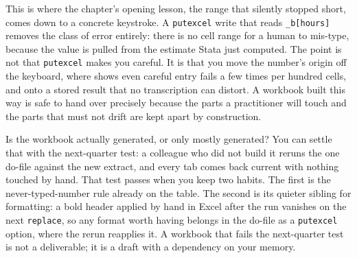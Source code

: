 \documentclass[
    a4paper,
    fontsize=10pt,
    twoside=true,
    numbers=noenddot,
]{kaobook}
\begin{document}
This is where the chapter's opening lesson, the range that silently stopped short, comes down to a concrete keystroke. A \texttt{putexcel} write that reads \texttt{\_b[hours]} removes the class of error entirely: there is no cell range for a human to mis-type, because the value is pulled from the estimate Stata just computed. The point is not that \texttt{putexcel} makes you careful. It is that you move the number's origin off the keyboard, where \textcite{panko1998errors} shows even careful entry fails a few times per hundred cells, and onto a stored result that no transcription can distort. A workbook built this way is safe to hand over precisely because the parts a practitioner will touch and the parts that must not drift are kept apart by construction.

Is the workbook actually generated, or only mostly generated? You can settle that with the next-quarter test: a colleague who did not build it reruns the one do-file against the new extract, and every tab comes back current with nothing touched by hand. That test passes when you keep two habits. The first is the never-typed-number rule already on the table. The second is its quieter sibling for formatting: a bold header applied by hand in Excel after the run vanishes on the next \texttt{replace}, so any format worth having belongs in the do-file as a \texttt{putexcel} option, where the rerun reapplies it. A workbook that fails the next-quarter test is not a deliverable; it is a draft with a dependency on your memory.
\end{document}
